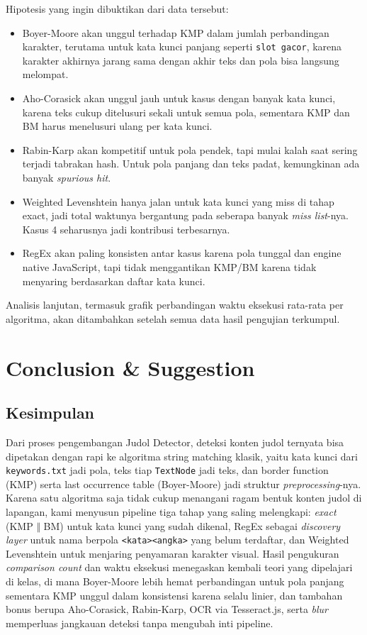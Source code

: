 \documentclass[11pt,a4paper]{article}
\begin{document}
Hipotesis yang ingin dibuktikan dari data tersebut:
\begin{itemize}
    \item Boyer-Moore akan unggul terhadap KMP dalam jumlah perbandingan karakter, terutama untuk kata kunci panjang seperti
    \texttt{slot gacor}, karena karakter akhirnya jarang sama dengan akhir teks dan pola bisa langsung melompat.
    \item Aho-Corasick akan unggul jauh untuk kasus dengan banyak kata kunci, karena teks cukup ditelusuri sekali untuk semua
    pola, sementara KMP dan BM harus menelusuri ulang per kata kunci.
    \item Rabin-Karp akan kompetitif untuk pola pendek, tapi mulai kalah saat sering terjadi tabrakan hash. Untuk pola panjang
    dan teks padat, kemungkinan ada banyak \textit{spurious hit}.
    \item Weighted Levenshtein hanya jalan untuk kata kunci yang miss di tahap exact, jadi total waktunya bergantung pada
    seberapa banyak \textit{miss list}-nya. Kasus 4 seharusnya jadi kontribusi terbesarnya.
    \item RegEx akan paling konsisten antar kasus karena pola tunggal dan engine native JavaScript, tapi tidak menggantikan
    KMP/BM karena tidak menyaring berdasarkan daftar kata kunci.
\end{itemize}

Analisis lanjutan, termasuk grafik perbandingan waktu eksekusi rata-rata per algoritma, akan ditambahkan setelah semua data
hasil pengujian terkumpul.

\newpage
\section{Conclusion \& Suggestion}

\subsection{Kesimpulan}

Dari proses pengembangan Judol Detector, deteksi konten judol ternyata bisa dipetakan dengan rapi ke algoritma string
matching klasik, yaitu kata kunci dari \texttt{keywords.txt} jadi pola, teks tiap \texttt{TextNode} jadi teks, dan border function
(KMP) serta last occurrence table (Boyer-Moore) jadi struktur \textit{preprocessing}-nya. Karena satu algoritma saja tidak cukup
menangani ragam bentuk konten judol di lapangan, kami menyusun pipeline tiga tahap yang saling melengkapi: \textit{exact} (KMP
$\Vert$ BM) untuk kata kunci yang sudah dikenal, RegEx sebagai \textit{discovery layer} untuk nama berpola \texttt{<kata><angka>}
yang belum terdaftar, dan Weighted Levenshtein untuk menjaring penyamaran karakter visual. Hasil pengukuran \textit{comparison
count} dan waktu eksekusi menegaskan kembali teori yang dipelajari di kelas, di mana Boyer-Moore lebih hemat perbandingan untuk
pola panjang sementara KMP unggul dalam konsistensi karena selalu linier, dan tambahan bonus berupa Aho-Corasick, Rabin-Karp,
OCR via Tesseract.js, serta \textit{blur} memperluas jangkauan deteksi tanpa mengubah inti pipeline.
\end{document}
